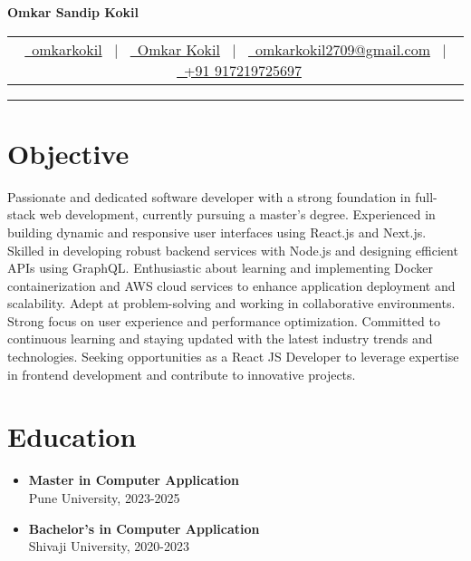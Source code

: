 \documentclass[a4paper,11pt]{article}
\begin{document}
\begin{center}
    \Huge{\textbf{Omkar Sandip Kokil}} \\[10pt]
    \normalsize
    \begin{tabular}{c}
        \href{https://github.com/omkarkokil}{\raisebox{-0.2\height}{\small\faGithub}\ omkarkokil} \ $|$ \ 
        \href{https://www.linkedin.com/in/omkar-kokil-384231285/}{\raisebox{-0.2\height}{\small\faLinkedin}\ Omkar Kokil} \ $|$ \ 
        \href{mailto:omkarkokil2709@gmail.com}{\raisebox{-0.2\height}{\small\faEnvelope}\ omkarkokil2709@gmail.com} \ $|$ \ 
        \href{tel:+91917219725697}{\raisebox{-0.2\height}{\small\faMobile}\ +91 917219725697}
    \end{tabular}
\end{center}

\vspace{0.5em}
\hrule
\vspace{1em}

\section*{Objective}
Passionate and dedicated software developer with a strong foundation in full-stack web development, currently pursuing a master’s degree. Experienced in building dynamic and responsive user interfaces using React.js and Next.js. Skilled in developing robust backend services with Node.js and designing efficient APIs using GraphQL. Enthusiastic about learning and implementing Docker containerization and AWS cloud services to enhance application deployment and scalability. Adept at problem-solving and working in collaborative environments. Strong focus on user experience and performance optimization. Committed to continuous learning and staying updated with the latest industry trends and technologies. Seeking opportunities as a React JS Developer to leverage expertise in frontend development and contribute to innovative projects.

\section*{Education}
\begin{itemize}[leftmargin=*]
    \item \textbf{Master in Computer Application} \\
    Pune University, 2023-2025
    \item \textbf{Bachelor’s in Computer Application} \\
    Shivaji University, 2020-2023
\end{itemize}
\end{document}
